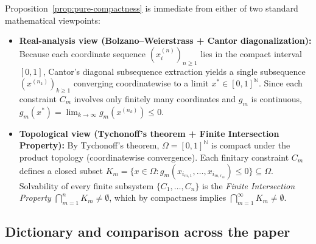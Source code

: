 \documentclass[11pt,letterpaper]{article}
\begin{document}
Proposition~\ref{prop:pure-compactness} is immediate from either of two standard mathematical viewpoints:
\begin{itemize}
\item \textbf{Real-analysis view (Bolzano--Weierstrass + Cantor diagonalization):} Because each coordinate sequence $(x_i^{(n)})_{n\ge 1}$ lies in the compact interval $[0,1]$, Cantor's diagonal subsequence extraction yields a single subsequence $(x^{(n_k)})_{k\ge 1}$ converging coordinatewise to a limit $x^*\in[0,1]^{\mathbb N}$. Since each constraint $C_m$ involves only finitely many coordinates and $g_m$ is continuous, $g_m(x^*) = \lim_{k\to\infty} g_m(x^{(n_k)}) \le 0$.
\item \textbf{Topological view (Tychonoff's theorem + Finite Intersection Property):} By Tychonoff's theorem, $\Omega = [0,1]^{\mathbb N}$ is compact under the product topology (coordinatewise convergence). Each finitary constraint $C_m$ defines a closed subset $K_m = \{x\in\Omega : g_m(x_{i_{m,1}},\ldots,x_{i_{m,r_m}})\le 0\} \subseteq \Omega$. Solvability of every finite subsystem $\{C_1,\ldots,C_n\}$ is the \emph{Finite Intersection Property} $\bigcap_{m=1}^n K_m \neq \emptyset$, which by compactness implies $\bigcap_{m=1}^\infty K_m \neq \emptyset$.
\end{itemize}

\subsection*{Dictionary and comparison across the paper}
\end{document}

